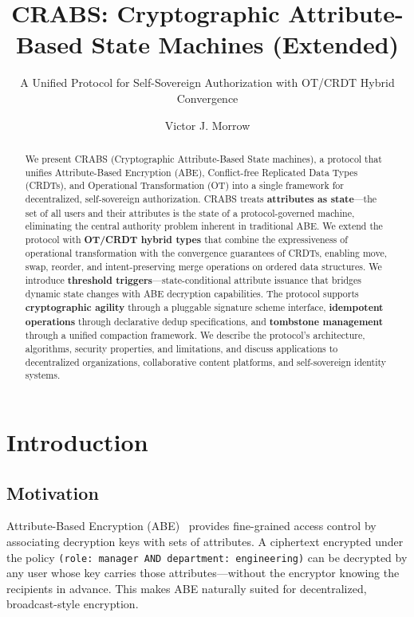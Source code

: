 \documentclass[sigconf,nonacm]{acmart}
\title{CRABS: Cryptographic Attribute-Based State Machines (Extended)}
\subtitle{A Unified Protocol for Self-Sovereign Authorization with OT/CRDT Hybrid Convergence}
\author{Victor J. Morrow}
\affiliation{%
  \institution{Prometheus}
}
\newcommand{\crab}{\textsc{CRABS}}
\begin{document}
\begin{abstract}
We present \crab{} (Cryptographic Attribute-Based State machines), a protocol that unifies Attribute-Based Encryption (ABE), Conflict-free Replicated Data Types (CRDTs), and Operational Transformation (OT) into a single framework for decentralized, self-sovereign authorization. \crab{} treats \textbf{attributes as state}---the set of all users and their attributes is the state of a protocol-governed machine, eliminating the central authority problem inherent in traditional ABE. We extend the protocol with \textbf{OT/CRDT hybrid types} that combine the expressiveness of operational transformation with the convergence guarantees of CRDTs, enabling move, swap, reorder, and intent-preserving merge operations on ordered data structures. We introduce \textbf{threshold triggers}---state-conditional attribute issuance that bridges dynamic state changes with ABE decryption capabilities. The protocol supports \textbf{cryptographic agility} through a pluggable signature scheme interface, \textbf{idempotent operations} through declarative dedup specifications, and \textbf{tombstone management} through a unified compaction framework. We describe the protocol's architecture, algorithms, security properties, and limitations, and discuss applications to decentralized organizations, collaborative content platforms, and self-sovereign identity systems.
\end{abstract}

\maketitle

\section{Introduction}

\subsection{Motivation}

Attribute-Based Encryption (ABE)~\cite{sahai2005fuzzy} provides fine-grained access control by associating decryption keys with sets of attributes. A ciphertext encrypted under the policy \texttt{(role: manager AND department: engineering)} can be decrypted by any user whose key carries those attributes---without the encryptor knowing the recipients in advance. This makes ABE naturally suited for decentralized, broadcast-style encryption.
\end{document}
